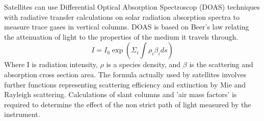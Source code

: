 
Satellites can use  Differential Optical Absorption Spectroscop (DOAS) techniques with radiative transfer calculations on solar radiation absorption spectra to measure trace gases in vertical columns.
DOAS is based on Beer's law relating the attenuation of light to the properties of the medium it travels through. 
$$ I = I_0 \exp \left( \Sigma_i \int \rho_i \beta_i ds \right) $$
Where I is radiation intensity, $\rho$ is a species density, and $\beta$ is the scattering and absorption cross section area.
The formula actually used by satellites involves further functions representing scattering efficiency and extinction by Mie and Rayleigh scattering.
Calculations of slant columns and 'air mass factors' is required to determine the effect of the non strict path of light measured by the instrument.
